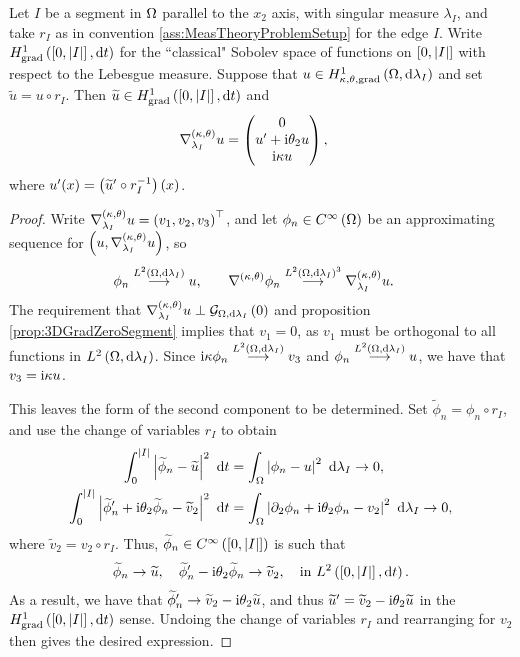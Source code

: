 \begin{prop} \label{prop:3DTangGradSegment}
	Let $I$ be a segment in $\Omega$ parallel to the $x_2$ axis, with singular measure $\lambda_I$, and take $r_I$ as in convention \ref{ass:MeasTheoryProblemSetup} for the edge $I$.
	Write $H^1_\mathrm{grad}\left( \left[ 0,\left\lvert I \right\rvert \right], \mathrm{d}t \right)$ for the ``classical" Sobolev space of functions on $\left[ 0,\left\lvert I \right\rvert \right]$ with respect to the Lebesgue measure.
	Suppose that $u\in H^1_{\kappa,\theta,\mathrm{grad}}\left( \Omega, \mathrm{d}\lambda_I \right)$ and set $\widetilde{u} = u \circ r_I$.
	Then $\widetilde{u}\in H^1_\mathrm{grad}\left( \left[ 0,\left\lvert I \right\rvert \right], \mathrm{d}t \right)$ and
	\begin{align*}
		\nabla^{\left( \kappa, \theta \right)}_{\lambda_I} u &= 
		\begin{pmatrix} 0 \\ u' + \mathrm{i}\theta_2 u \\ \mathrm{i}\kappa u \end{pmatrix},
	\end{align*}
	where $u'(x) = \left( \widetilde{u}'\circ r_I^{-1} \right)(x)$.
\end{prop}
\begin{proof}
	Write $\nabla^{\left( \kappa, \theta \right)}_{\lambda_I} u = \left( v_1, v_2, v_3 \right)^\top$, and let $\phi_n\in C^{\infty}\left( \Omega \right)$ be an approximating sequence for $\left( u, \nabla^{\left( \kappa, \theta \right)}_{\lambda_I}u \right)$, so
	\begin{align*}
		\phi_n \overset{L^{2}\left( \Omega,\mathrm{d}\lambda_I \right)}{\longrightarrow} u, &\qquad \nabla^{\left( \kappa, \theta \right)}\phi_n \overset{L^{2}\left( \Omega,\mathrm{d}\lambda_I \right)^3}{\longrightarrow}\nabla^{\left( \kappa, \theta \right)}_{\lambda_I}u.
	\end{align*}
	The requirement that $\nabla^{\left( \kappa, \theta \right)}_{\lambda_I} u \perp \mathcal{G}_{ \Omega, \mathrm{d}\lambda_I}\left( 0 \right)$ and proposition \ref{prop:3DGradZeroSegment} implies that $v_1=0$, as $v_1$ must be orthogonal to all functions in $L^{2}\left( \Omega,\mathrm{d}\lambda_I \right)$.
	Since $\mathrm{i}\kappa\phi_n\overset{L^{2}\left( \Omega,\mathrm{d}\lambda_I \right)}{\longrightarrow} v_3$ and $\phi_n\overset{L^{2}\left( \Omega,\mathrm{d}\lambda_I \right)}{\longrightarrow}u$, we have that $v_3 = \mathrm{i}\kappa u$.
	
	This leaves the form of the second component to be determined.
	Set $\widetilde{\phi}_n = \phi_n \circ r_I$, and use the change of variables $r_I$ to obtain
	\begin{align*}
		\int_0^{\abs{I}} \abs{ \widetilde{\phi}_n - \widetilde{u} }^2 \ \md t 
		&= \integral{\ddom}{ \abs{ \phi_n - u }^2 }{\lambda_I} \rightarrow 0, \\
		\int_0^{\abs{I}} \abs{ \widetilde{\phi}'_n + \rmi\qm_2\widetilde{\phi}_n - \widetilde{v}_2 }^2 \ \md t 
		&= \integral{\ddom}{ \abs{ \partial_2\phi_n + \rmi\qm_2\phi_n - v_2 }^2 }{\lambda_I} \rightarrow 0,
	\end{align*}
	where $\widetilde{v}_2 = v_2\circ r_I$.
	Thus, $\widetilde{\phi}_n\in C^{\infty}\left( \left[ 0,\left\lvert I \right\rvert \right] \right)$ is such that
	\begin{align*}
		\widetilde{\phi}_n \rightarrow \widetilde{u}, \quad
		\widetilde{\phi}'_n - \mathrm{i}\theta_2\widetilde{\phi}_n \rightarrow \widetilde{v}_2, \quad
		\text{in } L^{2}\left( \left[ 0,\left\lvert I \right\rvert \right],\mathrm{d}t \right).
	\end{align*}
	As a result, we have that $\widetilde{\phi}'_n \rightarrow  \widetilde{v}_2 - \mathrm{i}\theta_2\widetilde{u}$, and thus $\widetilde{u}' = \widetilde{v}_2 - \mathrm{i}\theta_2\widetilde{u}$ in the $H^1_\mathrm{grad}\left( \left[ 0,\left\lvert I \right\rvert \right], \mathrm{d}t \right)$ sense.
	Undoing the change of variables $r_I$ and rearranging for $v_2$ then gives the desired expression.
\end{proof}

